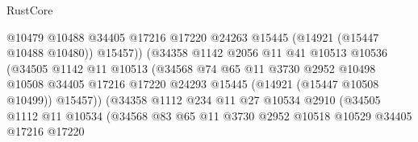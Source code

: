 \begin{lexlean}{RustCore}
\begin{coremodule}
                                      @10479
                                      @10488
                                      @34405
                                      @17216
                                      @17220
                                      @24263
                                      @15445
                                      (@14921 (@15447 @10488 @10480))
                                      @15457))
                                  (@34358
                                    @1142
                                    @2056
                                    @11
                                    @41
                                    @10513
                                    @10536
                                    (@34505
                                      @1142
                                      @11
                                      @10513
                                      (@34568
                                        @74
                                        @65
                                        @11
                                        @3730
                                        @2952
                                        @10498
                                        @10508
                                        @34405
                                        @17216
                                        @17220
                                        @24293
                                        @15445
                                        (@14921 (@15447 @10508 @10499))
                                        @15457))
                                    (@34358
                                      @1112
                                      @234
                                      @11
                                      @27
                                      @10534
                                      @2910
                                      (@34505
                                        @1112
                                        @11
                                        @10534
                                        (@34568
                                          @83
                                          @65
                                          @11
                                          @3730
                                          @2952
                                          @10518
                                          @10529
                                          @34405
                                          @17216
                                          @17220

\end{coremodule}
\end{lexlean}

